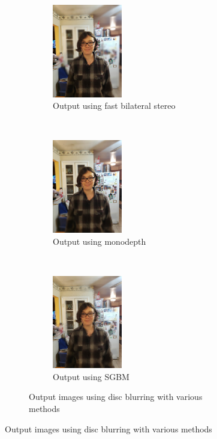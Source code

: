 \documentclass[10pt,twocolumn,letterpaper]{article}
\begin{document}
\begin{figure}[t!]
    \begin{subfigure}[t!]{\textwidth}
    \centering
    \begin{subfigure}[t]{0.33\textwidth}
        \centering
        \includegraphics[width=1.2in]{bin/output_FBIL.jpg}
        \caption{Output using fast bilateral stereo}
    \end{subfigure}%
    ~
    \begin{subfigure}[t]{0.33\textwidth}
        \centering
        \includegraphics[width=1.2in]{bin/output_monodepth.jpg}
        \caption{Output using monodepth}
    \end{subfigure}%
    ~
    \begin{subfigure}[t]{0.33\textwidth}
        \centering
        \includegraphics[width=1.2in]{bin/output_SGBM.jpg}
        \caption{Output using SGBM}
    \end{subfigure}
    \caption*{Output images using disc blurring with various methods}
    \end{subfigure}


\end{figure}
\end{document}

